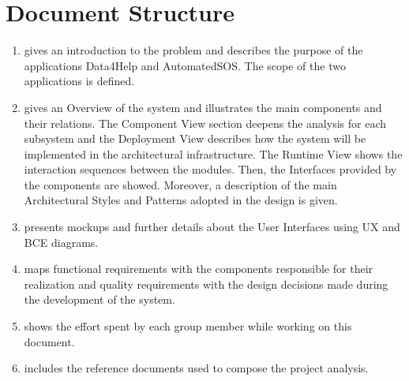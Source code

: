 \section{Document Structure}
\begin{enumerate} [label={Section \arabic*}]
    \item gives an introduction to the problem and describes the purpose of the applications Data4Help and AutomatedSOS. The scope of the two applications is defined.
    \item gives an Overview of the system and illustrates the main components and their relations. The Component View section deepens the analysis for each subsystem and the Deployment View describes how the system will be implemented in the architectural infrastructure. The Runtime View shows the interaction sequences between the modules. Then, the Interfaces provided by the components are showed. Moreover, a description of the main Architectural Styles and Patterns adopted in the design is given.
    \item presents mockups and further details about the User Interfaces using UX and BCE diagrams.
    \item maps functional requirements with the components responsible for their realization and quality requirements with the design decisions made during the development of the system.
    \item shows the effort spent by each group member while working on this document.
    \item includes the reference documents used to  compose the project analysis.
\end{enumerate}
